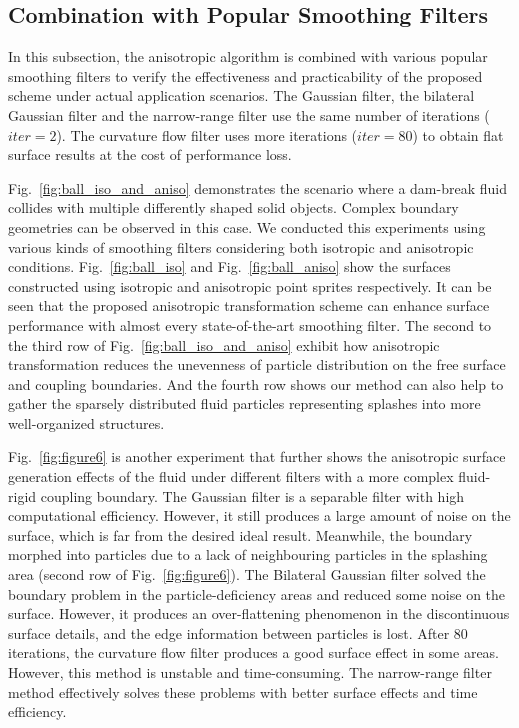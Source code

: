 \documentclass[times,twocolumn,final]{elsarticle}
\begin{document}
\subsection{Combination with Popular Smoothing Filters}
In this subsection, the anisotropic algorithm is combined with various popular smoothing filters to verify the effectiveness and practicability of the proposed scheme under actual application scenarios. The Gaussian filter, the bilateral Gaussian filter and the narrow-range filter use the same number of iterations ($iter=2$). The curvature flow filter uses more iterations ($iter=80$) to obtain flat surface results at the cost of performance loss.


Fig.~\ref{fig:ball_iso_and_aniso} demonstrates the scenario where a dam-break fluid collides with multiple differently shaped solid objects. Complex boundary geometries can be observed in this case. We conducted this experiments using various kinds of smoothing filters considering both isotropic and anisotropic conditions. Fig.~\ref{fig:ball_iso} and Fig.~\ref{fig:ball_aniso} show the surfaces constructed using isotropic and anisotropic point sprites respectively. It can be seen that the proposed anisotropic transformation scheme can enhance surface performance with almost every state-of-the-art smoothing filter. The second to the third row of Fig.~\ref{fig:ball_iso_and_aniso} exhibit how anisotropic transformation reduces the unevenness of particle distribution on the free surface and coupling boundaries. And the fourth row shows our method can also help to gather the sparsely distributed fluid particles representing splashes into more well-organized structures.

Fig.~\ref{fig:figure6} is another experiment that further shows the anisotropic surface generation effects of the fluid under different filters with a more complex fluid-rigid coupling boundary. The Gaussian filter is a separable filter with high computational efficiency. However, it still produces a large amount of noise on the surface, which is far from the desired ideal result. Meanwhile, the boundary morphed into particles due to a lack of neighbouring particles in the splashing area (second row of Fig.~\ref{fig:figure6}). The Bilateral Gaussian filter solved the boundary problem in the particle-deficiency areas and reduced some noise on the surface. However, it produces an over-flattening phenomenon in the discontinuous surface details, and the edge information between particles is lost. After 80 iterations, the curvature flow filter produces a good surface effect in some areas. However, this method is unstable and time-consuming. The narrow-range filter method effectively solves these problems with better surface effects and time efficiency.
\end{document}
